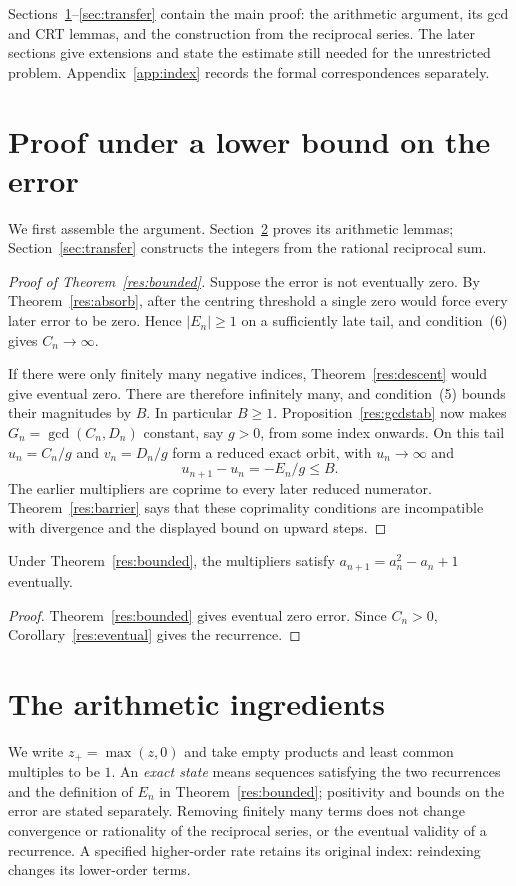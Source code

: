 \documentclass[11pt]{article}
\begin{document}
Sections~\ref{sec:bounded}--\ref{sec:transfer} contain the main proof:
the arithmetic argument, its gcd and CRT lemmas, and the construction
from the reciprocal series. The later sections give extensions and
state the estimate still needed for the unrestricted problem.
Appendix~\ref{app:index} records the formal correspondences separately.

\section{Proof under a lower bound on the error}\label{sec:bounded}
We first assemble the argument. Section~\ref{sec:state} proves its
arithmetic lemmas; Section~\ref{sec:transfer} constructs the integers
from the rational reciprocal sum.

\begin{proof}[Proof of Theorem~\ref{res:bounded}]
Suppose the error is not eventually zero. By Theorem~\ref{res:absorb},
after the centring threshold a single zero would force every later error
to be zero. Hence $|E_n|\ge1$ on a sufficiently late tail, and
condition~(6) gives $C_n\to\infty$.

If there were only finitely many negative indices,
Theorem~\ref{res:descent} would give eventual zero. There are therefore
infinitely many, and condition~(5) bounds their magnitudes by $B$.
In particular $B\ge1$. Proposition~\ref{res:gcdstab} now makes
$G_n=\gcd(C_n,D_n)$ constant, say $g>0$, from some index onwards.
On this tail $u_n=C_n/g$ and $v_n=D_n/g$ form a reduced exact orbit,
with $u_n\to\infty$ and
\[
 u_{n+1}-u_n=-E_n/g\le B.
\]
The earlier multipliers are coprime to every later reduced numerator.
Theorem~\ref{res:barrier} says that these coprimality conditions are
incompatible with divergence and the displayed bound on upward steps.
\end{proof}

\begin{corollary}\label{res:cor}
Under Theorem~\ref{res:bounded}, the multipliers satisfy
$a_{n+1}=a_n^2-a_n+1$ eventually.
\end{corollary}
\begin{proof}
Theorem~\ref{res:bounded} gives eventual zero error. Since $C_n>0$,
Corollary~\ref{res:eventual} gives the recurrence.
\end{proof}

\section{The arithmetic ingredients}\label{sec:state}
We write $z_+=\max(z,0)$ and take empty products and least common
multiples to be $1$. An \emph{exact state} means sequences satisfying the
two recurrences and the definition of $E_n$ in Theorem~\ref{res:bounded};
positivity and bounds on the error are stated separately. Removing finitely
many terms does not change convergence or rationality of the reciprocal
series, or the eventual validity of a recurrence. A specified higher-order
rate retains its original index: reindexing changes its lower-order terms.
\end{document}
